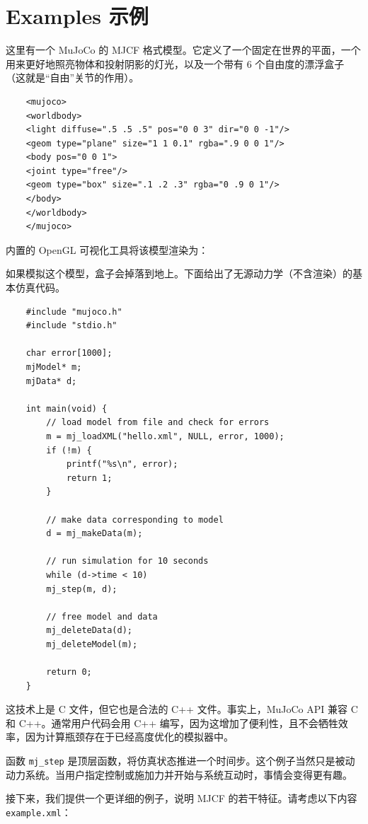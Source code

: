\section{Examples 示例}

这里有一个 MuJoCo 的 MJCF 格式模型。它定义了一个固定在世界的平面，一个用来更好地照亮物体和投射阴影的灯光，以及一个带有 6 个自由度的漂浮盒子（这就是“自由”关节的作用）。

\begin{verbatim}
	<mujoco>
	<worldbody>
	<light diffuse=".5 .5 .5" pos="0 0 3" dir="0 0 -1"/>
	<geom type="plane" size="1 1 0.1" rgba=".9 0 0 1"/>
	<body pos="0 0 1">
	<joint type="free"/>
	<geom type="box" size=".1 .2 .3" rgba="0 .9 0 1"/>
	</body>
	</worldbody>
	</mujoco>
\end{verbatim}

内置的 OpenGL 可视化工具将该模型渲染为：
% 

如果模拟这个模型，盒子会掉落到地上。下面给出了无源动力学（不含渲染）的基本仿真代码。

\begin{lstlisting}
	#include "mujoco.h"
	#include "stdio.h"
	
	char error[1000];
	mjModel* m;
	mjData* d;
	
	int main(void) {
		// load model from file and check for errors
		m = mj_loadXML("hello.xml", NULL, error, 1000);
		if (!m) {
			printf("%s\n", error);
			return 1;
		}
		
		// make data corresponding to model
		d = mj_makeData(m);
		
		// run simulation for 10 seconds
		while (d->time < 10)
		mj_step(m, d);
		
		// free model and data
		mj_deleteData(d);
		mj_deleteModel(m);
		
		return 0;
	}
\end{lstlisting}

这技术上是 C 文件，但它也是合法的 C++ 文件。事实上，MuJoCo API 兼容 C 和 C++。通常用户代码会用 C++ 编写，因为这增加了便利性，且不会牺牲效率，因为计算瓶颈存在于已经高度优化的模拟器中。

函数 \texttt{mj\_step} 是顶层函数，将仿真状态推进一个时间步。这个例子当然只是被动动力系统。当用户指定控制或施加力并开始与系统互动时，事情会变得更有趣。

接下来，我们提供一个更详细的例子，说明 MJCF 的若干特征。请考虑以下内容 \texttt{example.xml}：

